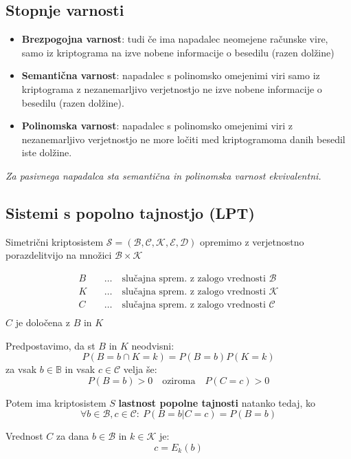 \begin{multicols}{5}
\subsection*{Stopnje varnosti}
\begin{itemize}
	\item \textbf{Brezpogojna varnost}: tudi če ima napadalec neomejene računske vire, samo iz kriptograma na izve nobene informacije o besedilu (razen dolžine)
	\item \textbf{Semantična varnost}: napadalec s polinomsko omejenimi viri samo iz kriptograma z nezanemarljivo verjetnostjo ne izve nobene informacije o besedilu (razen dolžine).
	\item \textbf{Polinomska varnost}: napadalec s polinomsko omejenimi viri z nezanemarljivo verjetnostjo ne more ločiti med kriptogramoma danih besedil iste dolžine.
\end{itemize}
\textit{Za pasivnega napadalca sta semantična in polinomska varnost ekvivalentni.}

\subsection*{Sistemi s popolno tajnostjo (LPT)}
Simetrični kriptosistem $\mathcal{S} = (\mathcal{B}, \mathcal{C}, \mathcal{K}, \mathcal{E}, \mathcal{D})$ opremimo
z verjetnostno porazdelitvijo na množici $\mathcal{B} \times \mathcal{K}$

\begin{align*}
	B \quad &\dots \quad \text{slučajna sprem. z zalogo vrednosti } \mathcal{B} \\
	K \quad &\dots \quad \text{slučajna sprem. z zalogo vrednosti } \mathcal{K} \\
	C \quad &\dots \quad \text{slučajna sprem. z zalogo vrednosti } \mathcal{C} \\
\end{align*}
$C$ je določena z $B$ in $K$

Predpostavimo, da st $B$ in $K$ neodvisni:
\[ P(B = b \cap K = k) = P(B = b) P(K = k) \]
za vsak $b \in \mathbb{B}$ in vsak $c \in \mathcal{C}$ velja še:
\[ P(B = b) > 0 \quad \text{oziroma} \quad P(C = c) > 0 \]

Potem ima kriptosistem $S$ \textbf{lastnost popolne tajnosti} natanko tedaj, ko
\[ \forall b \in \mathcal{B}, c \in \mathcal{C}: \ P(B = b | C = c) = P(B = b)\]

Vrednost $C$ za dana $b \in \mathcal{B}$ in $k \in \mathcal{K}$ je:
\[ c = E_k(b) \]


\end{multicols}
